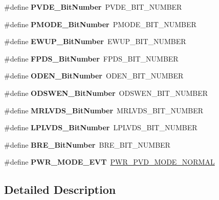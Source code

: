 \begin{DoxyCompactItemize}
\#define {\bfseries P\+V\+D\+E\+\_\+\+Bit\+Number}~P\+V\+D\+E\+\_\+\+B\+I\+T\+\_\+\+N\+U\+M\+B\+ER
\item 
\mbox{\label{group___h_a_l___p_w_r___aliased_ga15fea9df1b0d324394336f70b319b377}} 
\#define {\bfseries P\+M\+O\+D\+E\+\_\+\+Bit\+Number}~P\+M\+O\+D\+E\+\_\+\+B\+I\+T\+\_\+\+N\+U\+M\+B\+ER
\item 
\mbox{\label{group___h_a_l___p_w_r___aliased_ga94fe0520e8f9b71fa2b99c0565ec70ea}} 
\#define {\bfseries E\+W\+U\+P\+\_\+\+Bit\+Number}~E\+W\+U\+P\+\_\+\+B\+I\+T\+\_\+\+N\+U\+M\+B\+ER
\item 
\mbox{\label{group___h_a_l___p_w_r___aliased_gad99a3da921e3e64587f6b9505ecba665}} 
\#define {\bfseries F\+P\+D\+S\+\_\+\+Bit\+Number}~F\+P\+D\+S\+\_\+\+B\+I\+T\+\_\+\+N\+U\+M\+B\+ER
\item 
\mbox{\label{group___h_a_l___p_w_r___aliased_ga2f24ddbcbc5b8d74c0b032cfa53c725a}} 
\#define {\bfseries O\+D\+E\+N\+\_\+\+Bit\+Number}~O\+D\+E\+N\+\_\+\+B\+I\+T\+\_\+\+N\+U\+M\+B\+ER
\item 
\mbox{\label{group___h_a_l___p_w_r___aliased_gaf2e21cacf95f557d2535d623c41577c2}} 
\#define {\bfseries O\+D\+S\+W\+E\+N\+\_\+\+Bit\+Number}~O\+D\+S\+W\+E\+N\+\_\+\+B\+I\+T\+\_\+\+N\+U\+M\+B\+ER
\item 
\mbox{\label{group___h_a_l___p_w_r___aliased_ga50e53827046644c175fe431eea5f4261}} 
\#define {\bfseries M\+R\+L\+V\+D\+S\+\_\+\+Bit\+Number}~M\+R\+L\+V\+D\+S\+\_\+\+B\+I\+T\+\_\+\+N\+U\+M\+B\+ER
\item 
\mbox{\label{group___h_a_l___p_w_r___aliased_ga7ebe7d965ce7638645ee9a5e35c01be7}} 
\#define {\bfseries L\+P\+L\+V\+D\+S\+\_\+\+Bit\+Number}~L\+P\+L\+V\+D\+S\+\_\+\+B\+I\+T\+\_\+\+N\+U\+M\+B\+ER
\item 
\mbox{\label{group___h_a_l___p_w_r___aliased_ga1a0832bfe421cdd6f2640ffb625cc2d8}} 
\#define {\bfseries B\+R\+E\+\_\+\+Bit\+Number}~B\+R\+E\+\_\+\+B\+I\+T\+\_\+\+N\+U\+M\+B\+ER
\item 
\mbox{\label{group___h_a_l___p_w_r___aliased_ga1092f618f6edca6f56e410e926455774}} 
\#define {\bfseries P\+W\+R\+\_\+\+M\+O\+D\+E\+\_\+\+E\+VT}~\hyperlink{group___p_w_r___p_v_d___mode_ga3a4bf701a36a14a4edf4dc5a28153277}{P\+W\+R\+\_\+\+P\+V\+D\+\_\+\+M\+O\+D\+E\+\_\+\+N\+O\+R\+M\+AL}
\end{DoxyCompactItemize}


\subsection{Detailed Description}
